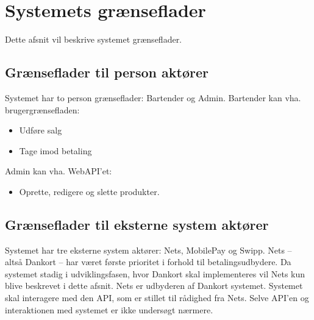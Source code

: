 \section{Systemets grænseflader}
Dette afsnit vil beskrive systemet grænseflader.

\subsection{Grænseflader til person aktører}
Systemet har to person grænseflader: Bartender og Admin.
\newline\newline
Bartender kan vha. brugergrænsefladen:
\begin{itemize}
	\item Udføre salg
	\item Tage imod betaling
\end{itemize}

Admin kan vha. WebAPI'et:
\begin{itemize}
	\item Oprette, redigere og slette produkter.
\end{itemize}

\subsection{Grænseflader til eksterne system aktører}
Systemet har tre eksterne system aktører: Nets, MobilePay og Swipp. Nets -- altså Dankort -- har været første prioritet i forhold til betalingsudbydere. Da systemet stadig i udviklingsfasen, hvor Dankort skal implementeres vil Nets kun blive beskrevet i dette afsnit.
\newline\newline
Nets er udbyderen af Dankort systemet. Systemet skal interagere med den API, som er stillet til rådighed fra Nets. Selve API'en og interaktionen med systemet er ikke undersøgt nærmere. 


